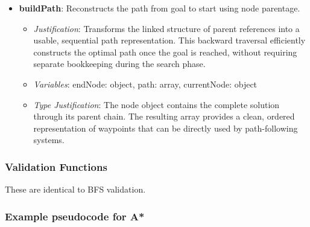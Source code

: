 \begin{itemize}
\item \textbf{buildPath}: Reconstructs the path from goal to start using node parentage. \begin{itemize} \item \textit{Justification}: Transforms the linked structure of parent references into a usable, sequential path representation. This backward traversal efficiently constructs the optimal path once the goal is reached, without requiring separate bookkeeping during the search phase. \item \textit{Variables}: endNode: object, path: array, currentNode: object \item \textit{Type Justification}: The node object contains the complete solution through its parent chain. The resulting array provides a clean, ordered representation of waypoints that can be directly used by path-following systems. \end{itemize} \end{itemize}

\subsubsection*{Validation Functions}

These are identical to BFS validation.

\subsubsection{Example pseudocode for A*}

